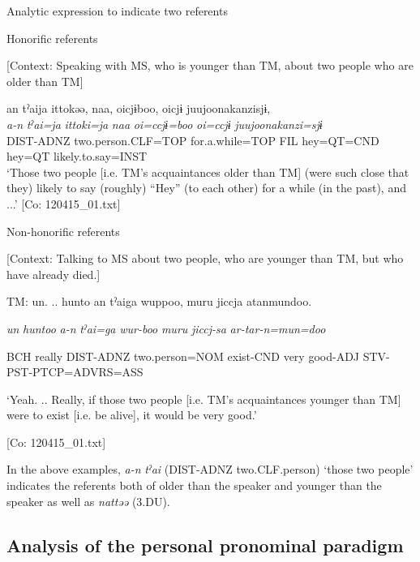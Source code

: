\ea \label{ex:5:13}   Analytic expression to indicate two referents

  \ea Honorific referents

  [Context: Speaking with MS, who is younger than TM, about two people who are older than TM]

\glll  an  tˀaija  ittokəə,  naa,  {\textbar}oi{\textbar}cjɨboo, {\textbar}oi{\textbar}cjɨ  {\textbar}juujoonakanzi{\textbar}sjɨ,\\
\textit{a-n}  \textit{tˀai=ja}  \textit{ittoki=ja}  \textit{naa}  \textit{oi=ccjɨ=boo}  \textit{oi=ccjɨ}  \textit{juujoonakanzi=sjɨ}\\
DIST-ADNZ  two.person.CLF=TOP  for.a.while=TOP  FIL  hey=QT=CND  hey=QT  likely.to.say=INST\\
\glt ‘Those two people [i.e. TM’s acquaintances older than TM] (were such close that they) likely to say (roughly) “Hey” (to each other) for a while (in the past), and ...’ [Co: 120415\_01.txt]

  \ex Non-honorific referents

  [Context: Talking to MS about two people, who are younger than TM, but who have already died.]

  TM:  un.  .. hunto  an  tˀaiga  wuppoo,  muru jiccja  atanmundoo.
                                                                                                  
    \textit{un}  \textit{huntoo}  \textit{a-n}  \textit{tˀai=ga}  \textit{wur-boo}  \textit{muru} \textit{jiccj-sa}  \textit{ar-tar-n=mun=doo}
                                                                                                  
    BCH  really  DIST-ADNZ  two.person=NOM  exist-CND  very   good-ADJ  STV-PST-PTCP=ADVRS=ASS

    ‘Yeah. .. Really, if those two people [i.e. TM’s acquaintances younger than TM] were to exist [i.e. be alive], it would be very good.’

    [Co: 120415\_01.txt]
\z
\z

In the above examples, \textit{a-n} \textit{tˀai} (DIST-ADNZ two.CLF.person) ‘those two people’ indicates the referents both of older than the speaker and younger than the speaker as well as \textit{nattəə} (3.DU).

\subsection{Analysis of the personal pronominal paradigm}

